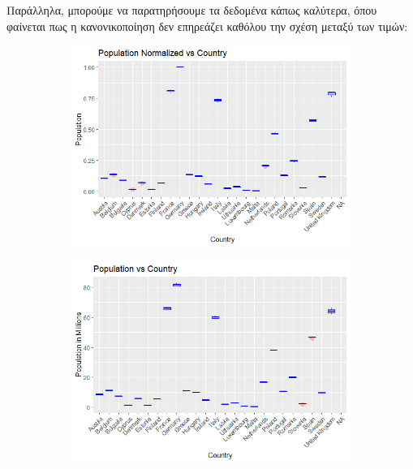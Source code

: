 \documentclass[a4paper,twoside,10pt]{article}
\begin{document}
Παράλληλα, μπορούμε να παρατηρήσουμε τα δεδομένα κάπως καλύτερα, όπου φαίνεται πως η κανονικοποίηση δεν επηρεάζει καθόλου την σχέση μεταξύ των τιμών:


\begin{figure}[H]
	\centering
	\begin{subfigure}[a]{0.8\textwidth}
		\centering
	\includegraphics[width=1\linewidth]{"images/Boxplot Population Normalized vs Country"}
	\caption{}
	\label{fig:boxplot-population-normalized-vs-country}
	\end{subfigure}
	\begin{subfigure}[b]{0.8\textwidth}
		\includegraphics[width=1\linewidth]{"images/Boxplot Population in Millions vs Country"}
		\caption{}
		\label{fig:boxplot-population-in-millions-vs-country}
	\end{subfigure}
\end{figure}
\end{document}
